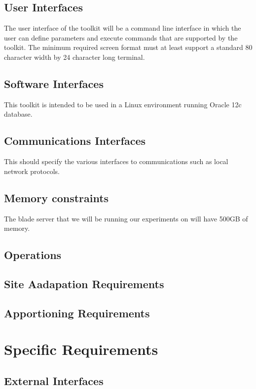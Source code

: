 \documentclass[draftclsnofoot, onecolumn, 10pt]{IEEEtran}
\begin{document}
\subsection{User Interfaces}
The user interface of the toolkit will be a command line interface in which the user can define parameters and execute commands that are supported by the toolkit. The minimum required screen format must at least support a standard 80 character width by 24 character long terminal.

\subsection{Software Interfaces}
This toolkit is intended to be used in a Linux environment running Oracle 12c database.

\subsection{Communications Interfaces}
This should specify the various interfaces to communications such as local network protocols.

\subsection{Memory constraints}
The blade server that we will be running our experiments on will have 500GB of memory. 

\subsection{Operations}

\subsection{Site Aadapation Requirements}


\subsection{Apportioning Requirements}

\section{Specific Requirements}

\subsection{External Interfaces}
\end{document}
